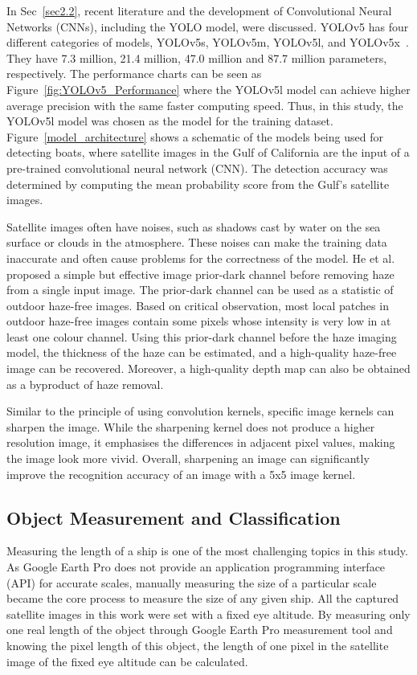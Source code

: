 In Sec~\ref{sec2.2}, recent literature and the development of Convolutional Neural Networks (CNNs), including the YOLO model, were discussed. YOLOv5 has four different categories of models, YOLOv5s, YOLOv5m, YOLOv5l, and YOLOv5x~\cite{glenn_jocher_2022_6222936}. They have 7.3 million, 21.4 million, 47.0 million and 87.7 million parameters, respectively. The performance charts can be seen as Figure~\ref{fig:YOLOv5_Performance} where the YOLOv5l model can achieve higher average precision with the same faster computing speed. Thus, in this study, the YOLOv5l model was chosen as the model for the training dataset. Figure~\ref{model_architecture} shows a schematic of the models being used for detecting boats, where satellite images in the Gulf of California are the input of a pre-trained convolutional neural network (CNN). The detection accuracy was determined by computing the mean probability score from the Gulf's satellite images.

Satellite images often have noises, such as shadows cast by water on the sea surface or clouds in the atmosphere. These noises can make the training data inaccurate and often cause problems for the correctness of the model. He et al.~\cite{He2009SingleIH} proposed a simple but effective image prior-dark channel before removing haze from a single input image. The prior-dark channel can be used as a statistic of outdoor haze-free images. Based on critical observation, most local patches in outdoor haze-free images contain some pixels whose intensity is very low in at least one colour channel. Using this prior-dark channel before the haze imaging model, the thickness of the haze can be estimated, and a high-quality haze-free image can be recovered. Moreover, a high-quality depth map can also be obtained as a byproduct of haze removal.

Similar to the principle of using convolution kernels, specific image kernels can sharpen the image. While the sharpening kernel does not produce a higher resolution image, it emphasises the differences in adjacent pixel values, making the image look more vivid. Overall, sharpening an image can significantly improve the recognition accuracy of an image with a 5x5 image kernel.

\subsection{Object Measurement and Classification}
Measuring the length of a ship is one of the most challenging topics in this study. As Google Earth Pro does not provide an application programming interface (API) for accurate scales, manually measuring the size of a particular scale became the core process to measure the size of any given ship. All the captured satellite images in this work were set with a fixed eye altitude. By measuring only one real length of the object through Google Earth Pro measurement tool and knowing the pixel length of this object, the length of one pixel in the satellite image of the fixed eye altitude can be calculated.

